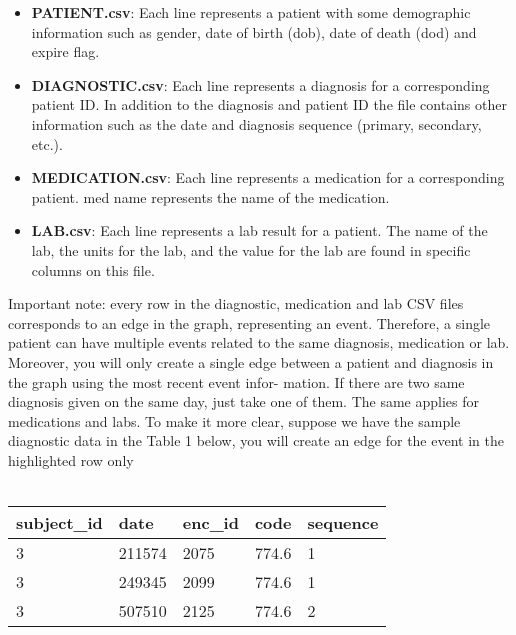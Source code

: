 \documentclass[12pt]{article}
\begin{document}
\begin{itemize}
\item \textbf{PATIENT.csv}: Each line represents a patient with some demographic information such as gender, date of birth (dob), date of death (dod) and expire flag. 
\item \textbf{DIAGNOSTIC.csv}: Each line represents a diagnosis for a corresponding patient ID. In addition to the diagnosis and patient ID the file contains other information such as the date and diagnosis sequence (primary, secondary, etc.).
\item \textbf{MEDICATION.csv}: Each line represents a medication for a corresponding patient. med name represents the name of the medication.
\item \textbf{LAB.csv}: Each line represents a lab result for a patient. The name of the lab, the units for the lab, and the value for the lab are found in specific columns on this file.
\end{itemize}
Important note: every row in the diagnostic, medication and lab CSV files corresponds to an edge in the graph, representing an event. Therefore, a single patient can have multiple events related to the same diagnosis, medication or lab. Moreover, you will only create a single edge between a patient and diagnosis in the graph using the most recent event infor- mation. If there are two same diagnosis given on the same day, just take one of them. The same applies for medications and labs. To make it more clear, suppose we have the sample diagnostic data in the Table 1 below, you will create an edge for the event in the highlighted row only
\\ \\
\begin{minipage}{\linewidth}
	 \label{table:sample_data}
	\begin{center}
		\begin{tabular}{ | l | l | l | l | l |}
			\hline
			subject\_id & date & enc\_id & code & sequence \\ 
			\hline
			3  &  211574 & 2075 & 774.6  & 1\\ 
			\hline \hline 
			3 &  249345 & 2099 & 774.6  & 1 \\ 
			\hline \hline
			\rowcolor{Yellow} 3 & 507510 & 2125 & 774.6  & 2 \\
			\hline
		\end{tabular}
	\end{center}
	\end {minipage}\\
\end{document}
